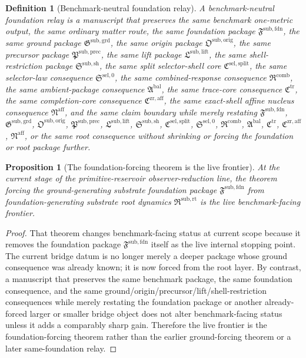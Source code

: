 \documentclass[11pt]{article}
\newcommand{\CompletionCore}{\mathfrak C^{\mathrm{zr,aff}}}
\newcommand{\TraceCore}{\mathfrak C^{\mathrm{tr}}}
\newcommand{\AffineNucleus}{\mathfrak N^{\mathrm{aff}}}
\newcommand{\AmbientPackage}{\mathfrak A^{\mathrm{bal}}}
\newcommand{\CombinedLaw}{\mathfrak R^{\mathrm{comb}}}
\newcommand{\SelectorLaw}{\mathfrak S^{\mathrm{sel},0}}
\newcommand{\SelectorCore}{\mathfrak C^{\mathrm{sel,split}}}
\newcommand{\ShellRestriction}{\mathfrak S^{\mathrm{sub,sh}}}
\newcommand{\LiftPackage}{\mathfrak L^{\mathrm{sub,lift}}}
\newcommand{\PrecursorPackage}{\mathfrak P^{\mathrm{sub,prec}}}
\newcommand{\OriginPackage}{\mathfrak O^{\mathrm{sub,orig}}}
\newcommand{\GroundPackage}{\mathfrak G^{\mathrm{sub,grd}}}
\newcommand{\FoundationPackage}{\mathfrak F^{\mathrm{sub,fdn}}}
\newcommand{\RootPackage}{\mathfrak R^{\mathrm{sub,rt}}}
\newtheorem{definition}{Definition}
\newtheorem{proposition}{Proposition}
\begin{document}
\begin{definition}[Benchmark-neutral foundation relay]
A \emph{benchmark-neutral foundation relay} is a manuscript that preserves the same benchmark one-metric output, the same ordinary matter route, the same foundation package \(\FoundationPackage\), the same ground package \(\GroundPackage\), the same origin package \(\OriginPackage\), the same precursor package \(\PrecursorPackage\), the same lift package \(\LiftPackage\), the same shell-restriction package \(\ShellRestriction\), the same split selector-shell core \(\SelectorCore\), the same selector-law consequence \(\SelectorLaw\), the same combined-response consequence \(\CombinedLaw\), the same ambient-package consequence \(\AmbientPackage\), the same trace-core consequence \(\TraceCore\), the same completion-core consequence \(\CompletionCore\), the same exact-shell affine nucleus consequence \(\AffineNucleus\), and the same claim boundary while merely restating \(\FoundationPackage\), \(\GroundPackage\), \(\OriginPackage\), \(\PrecursorPackage\), \(\LiftPackage\), \(\ShellRestriction\), \(\SelectorCore\), \(\SelectorLaw\), \(\CombinedLaw\), \(\AmbientPackage\), \(\TraceCore\), \(\CompletionCore\), \(\AffineNucleus\), or the same root consequence without shrinking or forcing the foundation or root package further.
\end{definition}

\begin{proposition}[The foundation-forcing theorem is the live frontier]
At the current stage of the primitive-reservoir observer-reduction line, the theorem forcing the ground-generating substrate foundation package \(\FoundationPackage\) from foundation-generating substrate root dynamics \(\RootPackage\) is the live benchmark-facing frontier.
\end{proposition}

\begin{proof}
That theorem changes benchmark-facing status at current scope because it removes the foundation package \(\FoundationPackage\) itself as the live internal stopping point. The current bridge datum is no longer merely a deeper package whose ground consequence was already known; it is now forced from the root layer. By contrast, a manuscript that preserves the same benchmark package, the same foundation consequence, and the same ground/origin/precursor/lift/shell-restriction consequences while merely restating the foundation package or another already-forced larger or smaller bridge object does not alter benchmark-facing status unless it adds a comparably sharp gain. Therefore the live frontier is the foundation-forcing theorem rather than the earlier ground-forcing theorem or a later same-foundation relay.
\end{proof}
\end{document}
